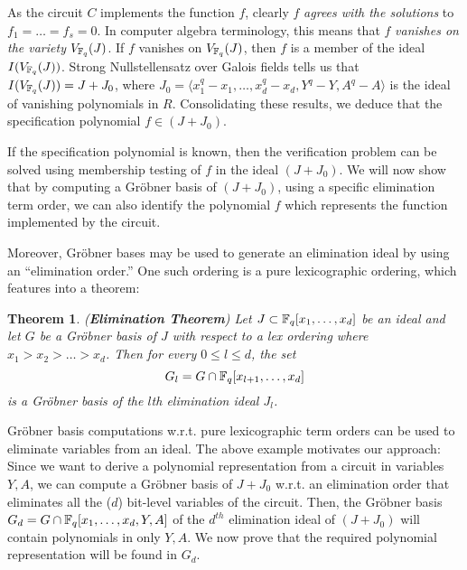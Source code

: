 \documentclass[conference,10pt]{IEEEtran}
\newtheorem{Theorem}{Theorem}[section]
\begin{document}
As the circuit $C$ implements the function $f$, clearly $f$ {\it
  agrees with the solutions} to $f_1 = \dots = f_s = 0$. In computer
algebra terminology, this means that $f$ {\it vanishes on the variety} 
$V_{{\mathbb{F}}_{q}}(J)$. If $f$ vanishes on $V_{{\mathbb{F}}_{q}}(J)$, then $f$ is a member of
the ideal $I(V_{{\mathbb{F}}_{q}}(J))$. Strong Nullstellensatz over Galois fields tells us that $I(V_{{\mathbb{F}}_{q}}(J)) =
J + J_0$, where $J_0 = \langle x_1^q - x_1, \dots, x_d^q - x_d, Y^q -
Y, A^q - A \rangle$ is the ideal of vanishing polynomials in
$R$. Consolidating these results, we deduce that the specification
polynomial $f \in (J+J_0)$. 

If the specification polynomial is known, then the verification
problem can be solved using membership testing of $f$ in the ideal $(J
+ J_0)$. We will now show
that by computing a Gr\"obner basis of $(J + J_0)$, using a specific
elimination term order, we can also identify the polynomial $f$ which
represents the function implemented by the circuit.

Moreover, Gr\"obner bases may be used to generate an elimination ideal
by using an ``elimination order.''  One such ordering
is a pure lexicographic ordering, which features into a theorem:
\begin{Theorem} \label{thm:elim}
({\bf Elimination Theorem}) Let $J
  \subset {\mathbb{F}}_{q}[x_1,\dots,x_d]$ be an     ideal and let $G$ be a
  Gr\"obner basis of $J$ with respect to a lex ordering where $x_1
  > x_2 > \dots > x_d$.  Then for every $0     \leq l \leq
  d$, the set 
    \begin{equation}
        G_l= G \cap {\mathbb{F}}_{q}[x_{l+1},\dots,x_d]
    \end{equation}
    is a Gr\"obner basis of the $l$th elimination ideal $J_l$.
\end{Theorem}

Gr\"obner basis computations w.r.t. pure lexicographic
term orders can be used to eliminate variables from an ideal. The
above example motivates our approach: Since we want to derive a
polynomial representation from a circuit in variables $Y, A$, we can
compute a Gr\"obner basis of $J + J_0$ w.r.t. an elimination order
that eliminates all the ($d$) bit-level variables of the
circuit. Then, the Gr\"obner basis $G_d = G \cap {\mathbb{F}}_{q}[x_1, \dots, x_d,
  Y, A]$ of the $d^{th}$ elimination ideal of $(J + J_0)$ will contain
polynomials in only $Y, A$. We now prove that the 
required polynomial representation will be found in $G_d$.
\end{document}
